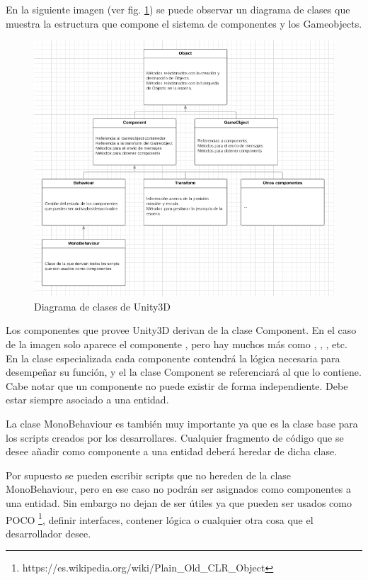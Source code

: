 En la siguiente imagen (ver fig. \ref{diagramaClasesUnity}) se puede observar un diagrama de clases que muestra la estructura que compone el sistema de componentes y los Gameobjects.

\begin{figure}[H]
\begin{center}
\includegraphics[scale=1]{imagenes/diagramaClasesUnity.png}
\caption{Diagrama de clases de Unity3D}
\label{diagramaClasesUnity}
\end{center}
\end{figure}

Los componentes que provee Unity3D derivan de la clase Component. En el caso de la imagen solo aparece el componente , pero hay muchos más como , , , etc. En la clase especializada cada componente contendrá la lógica necesaria para desempeñar su función, y el la clase Component se referenciará al  que lo contiene. Cabe notar que un componente no puede existir de forma independiente. Debe estar siempre asociado a una entidad.

La clase MonoBehaviour es también muy importante ya que es la clase base para los scripts creados por los desarrollares. Cualquier fragmento de código que se desee añadir como componente a una entidad deberá heredar de dicha clase. 

Por supuesto se pueden escribir scripts que no hereden de la clase MonoBehaviour, pero en ese caso no podrán ser asignados como componentes a una entidad. Sin embargo no dejan de ser útiles ya que pueden ser usados como POCO \footnote{https://es.wikipedia.org/wiki/Plain\_Old\_CLR\_Object}, definir interfaces, contener lógica o cualquier otra cosa que el desarrollador desee. 

